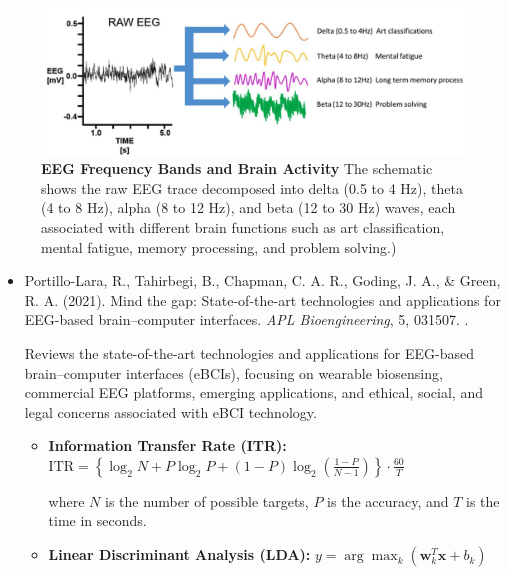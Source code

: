 \documentclass[10pt,svgnames,fragile]{beamer}
\begin{document}
\begin{frame}{}
\tiny
\vspace{-0.18cm}
\begin{figure}
    \centering
    \includegraphics[width=0.62\linewidth]{robotor_figure.png}
    \caption{\textbf{EEG Frequency Bands and Brain Activity} The schematic shows the raw EEG trace decomposed into delta (0.5 to 4 Hz), theta (4 to 8 Hz), alpha (8 to 12 Hz), and beta (12 to 30 Hz) waves, each associated with different brain functions such as art classification, mental fatigue, memory processing, and problem solving.)\cite{portillo-laraMindGapStateoftheart2021}}
    \label{fig:robotor_figure}
\end{figure}
\vspace{-0.2cm} %
\begin{itemize}
    \item Portillo-Lara, R., Tahirbegi, B., Chapman, C. A. R., Goding, J. A., \& Green, R. A. (2021). Mind the gap: State-of-the-art technologies and applications for EEG-based brain–computer interfaces. \textit{APL Bioengineering}, 5, 031507. \href{https://doi.org/10.1063/5.0047237}{\color{blue}{DOI: 10.1063/5.0047237}}. \cite{portillo-laraMindGapStateoftheart2021}

    {\color{gray}Reviews the state-of-the-art technologies and applications for EEG-based brain–computer interfaces (eBCIs), focusing on wearable biosensing, commercial EEG platforms, emerging applications, and ethical, social, and legal concerns associated with eBCI technology.}
    \begin{itemize} \tiny
    \item \textbf{Information Transfer Rate (ITR):}
    \(
    \text{ITR} = \left\{ \log_2 N + P \log_2 P + (1 - P) \log_2 \left( \frac{1 - P}{N - 1} \right) \right\} \cdot \frac{60}{T}
    \)
    
    where \( N \) is the number of possible targets, \( P \) is the accuracy, and \( T \) is the time in seconds.

    \item \textbf{Linear Discriminant Analysis (LDA):}
    \(
    y = \arg\max_k \left( \mathbf{w}_k^T \mathbf{x} + b_k \right)
    \)
    

\end{itemize}
\end{itemize}
\end{frame}
\end{document}
